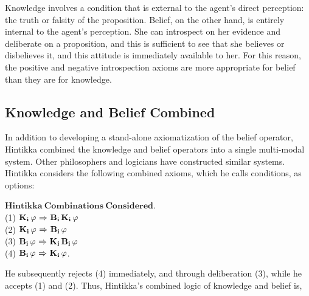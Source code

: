 Knowledge involves a condition that is external to the agent's direct perception: the truth or falsity of the proposition. Belief, on the other hand, is entirely internal to the agent's perception. She can introspect on her evidence and deliberate on a proposition, and this is sufficient to see that she believes or disbelieves it, and this attitude is immediately available to her. For this reason, the positive and negative introspection axioms are more appropriate for belief than they are for knowledge. 

\subsection{Knowledge and Belief Combined}
In addition to developing a stand-alone axiomatization of the belief operator, Hintikka combined the knowledge and belief operators into a single multi-modal system. Other philosophers and logicians have constructed similar systems. Hintikka considers the following combined axioms, which he calls conditions, as options:

$\mathbf{Hintikka\ Combinations\ Considered}$.\\
(1) $\mathbf{K}_{\mathbf{i}}\,\varphi {\ \Rightarrow \ } \mathbf{B}_{\mathbf{i}}\,\mathbf{K}_{\mathbf{i}}\,\varphi$\\
(2) $\mathbf{K}_{\mathbf{i}}\,\varphi {\ \Rightarrow \ } \mathbf{B}_{\mathbf{i}}\,\varphi$\\
(3) $\mathbf{B}_{\mathbf{i}}\,\varphi {\ \Rightarrow \ } \mathbf{K}_{\mathbf{i}}\,\mathbf{B}_{\mathbf{i}}\,\varphi$\\
(4) $\mathbf{B}_{\mathbf{i}}\,\varphi {\ \Rightarrow \ } \mathbf{K}_{\mathbf{i}}\,\varphi$.

He subsequently rejects (4) immediately, and through deliberation (3), while he accepts (1) and (2). Thus, Hintikka's combined logic of knowledge and belief is,

